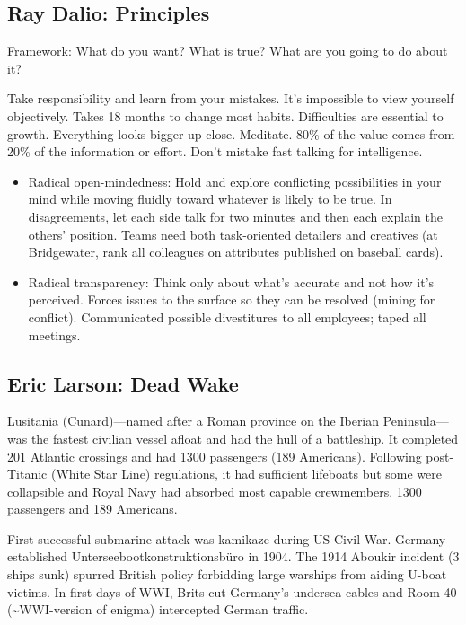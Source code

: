 \documentclass[
]{article}
\begin{document}
\hypertarget{ray-dalio-principles}{%
\subsection{Ray Dalio: Principles}\label{ray-dalio-principles}}

Framework: What do you want? What is true? What are you going to do
about it?

Take responsibility and learn from your mistakes. It's impossible to
view yourself objectively. Takes 18 months to change most habits.
Difficulties are essential to growth. Everything looks bigger up close.
Meditate. 80\% of the value comes from 20\% of the information or
effort. Don't mistake fast talking for intelligence.

\begin{itemize}
\item
  Radical open-mindedness: Hold and explore conflicting possibilities in
  your mind while moving fluidly toward whatever is likely to be true.
  In disagreements, let each side talk for two minutes and then each
  explain the others' position. Teams need both task-oriented detailers
  and creatives (at Bridgewater, rank all colleagues on attributes
  published on baseball cards).
\item
  Radical transparency: Think only about what's accurate and not how
  it's perceived. Forces issues to the surface so they can be resolved
  (mining for conflict). Communicated possible divestitures to all
  employees; taped all meetings.
\end{itemize}

\hypertarget{eric-larson-dead-wake}{%
\subsection{Eric Larson: Dead Wake}\label{eric-larson-dead-wake}}

Lusitania (Cunard)---named after a Roman province on the Iberian
Peninsula---was the fastest civilian vessel afloat and had the hull of a
battleship. It completed 201 Atlantic crossings and had 1300 passengers
(189 Americans). Following post-Titanic (White Star Line) regulations,
it had sufficient lifeboats but some were collapsible and Royal Navy had
absorbed most capable crewmembers. 1300 passengers and 189 Americans.

First successful submarine attack was kamikaze during US Civil War.
Germany established Unterseebootkonstruktionsbüro in 1904. The 1914
Aboukir incident (3 ships sunk) spurred British policy forbidding large
warships from aiding U-boat victims. In first days of WWI, Brits cut
Germany's undersea cables and Room 40 (\textasciitilde WWI-version of
enigma) intercepted German traffic.
\end{document}
